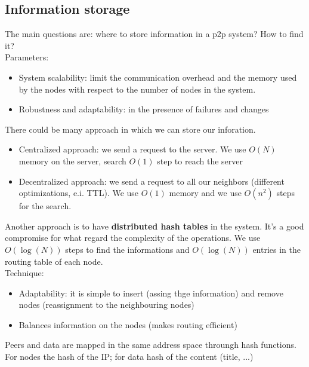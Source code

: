 \documentclass[paper=a4, fontsize=11pt]{scrartcl} %
\numberwithin{equation}{section} %
\numberwithin{figure}{section} %
\numberwithin{table}{section} %
\begin{document}
\subsection*{Information storage}
The main questions are: where to store information in a p2p system? How to find it?\\
Parameters: 
\begin{itemize}
\item System scalability: limit the communication overhead and the memory used by the nodes with respect to the number of nodes in the system.
\item Robustness and adaptability: in the presence of failures and changes
\end{itemize}
There could be many approach in which we can store our inforation.
\begin{itemize}
\item Centralized approach: we send a request to the server. We use $O(N)$ memory on the server, search $O(1)$ step to reach the server
\item Decentralized approach: we send a request to all our neighbors (different optimizations, e.i. TTL). We use $O(1)$ memory and we use $O(n^2)$ steps for the search.
\end{itemize}
Another approach is to have \textbf{distributed hash tables} in the system. It's a good compromise for what regard the complexity of the operations. We use $O(\log(N))$ steps to find the informations and $O(\log(N))$ entries in the routing table of each node.\\
Technique: 
\begin{itemize}
\item Adaptability: it is simple to insert (assing thge information) and remove nodes (reassignment to the neighbouring nodes)
\item Balances information on the nodes (makes routing efficient)
\end{itemize}
Peers and data are mapped in the same address space throungh hash functions. For nodes the hash of the IP; for data hash of the content (title, ...)\\
\end{document}
